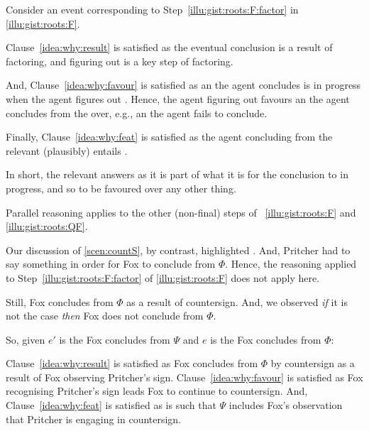 \begin{note}
  Consider an event corresponding to Step~\ref{illu:gist:roots:F:factor} in \autoref{illu:gist:roots:F}.

  Clause~\ref{idea:why:result} is satisfied as the eventual conclusion is a result of factoring, and figuring out  is a key step of factoring.

  And, Clause~\ref{idea:why:favour} is satisfied as an  the agent concludes  is in progress when the agent figures out .
  Hence, the agent figuring out  favours an  the agent concludes  from the \pool{} over, e.g., an  the agent fails to conclude.

  Finally, Clause~\ref{idea:why:feat} is satisfied as the agent concluding  from the relevant \pool{} (plausibly) entails .
\end{note}


\begin{note}
  In short, the relevant  answers \qWhy{} as it is part of what it is for the conclusion to in progress, and so to be favoured over any other thing.

  Parallel reasoning applies to the other (non-final) steps of ~\ref{illu:gist:roots:F} and \ref{illu:gist:roots:QF}.
\end{note}


\begin{note}
  Our discussion of \autoref{scen:countS}, by contrast, highlighted .
  And, Pritcher had to say something in order for Fox to conclude  from \(\Phi\).
  Hence, the reasoning applied to Step~\ref{illu:gist:roots:F:factor} of \autoref{illu:gist:roots:F} does not apply here.

  Still, Fox concludes  from \(\Phi\) as a result of countersign.
  And, we observed \emph{if} it is not the case  \emph{then} Fox does not conclude  from \(\Phi\).

  So, given \(e'\) is the  Fox concludes  from \(\Psi\) and \(e\) is the  Fox concludes  from \(\Phi\):

  Clause~\ref{idea:why:result} is satisfied as Fox concludes  from \(\Phi\) by countersign as a result of Fox observing Pritcher's sign.
  Clause~\ref{idea:why:favour} is satisfied as Fox recognising Pritcher's sign leads Fox to continue to countersign.
  And, Clause~\ref{idea:why:feat} is satisfied as  is such that \(\Psi\) includes Fox's observation that Pritcher is engaging in countersign.
\end{note}


